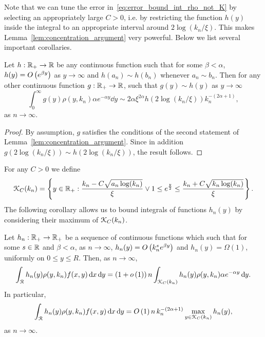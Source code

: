 Note that we can tune the error in~\eqref{eq:error_bound_int_rho_not_K} by selecting an appropriately large $C > 0$, i.e. by restricting the function $h(y)$ inside the integral to an appropriate interval around $2\log(k_n/\xi)$. This makes Lemma~\ref{lem:concentration_argument} very powerful. Below we list several important corollaries. 

\begin{corollary}\label{cor:concentration_of_heights_asymptotics}
Let $h : {\mathbb R}_+ \to {\ensuremath{\mathbb R}}$ be any continuous function such that for some $\beta < \alpha$, $h(y) = O\left(e^{\beta y}\right)$ as $y \to \infty$ and $h(a_n) \sim h(b_n)$ whenever $a_n \sim b_n$. Then for any other continuous function $g: {\mathbb R}_+ \to {\ensuremath{\mathbb R}}$, such that $g(y) \sim h(y)$ as $y \to \infty$
\begin{equation}\label{eq:concentration_h_sim_rho}
	\int_0^\infty g(y) \rho(y,k_n) \alpha e^{-\alpha y} \dd y \sim  
		2\alpha \xi^{2\alpha} h(2\log(k_n/\xi)) k_n^{-(2\alpha + 1)},
\end{equation}
as $n \to \infty$.
\end{corollary}

\begin{proof}
By assumption, $g$ satisfies the conditions of the second statement of Lemma~\ref{lem:concentration_argument}. Since in addition $g(2\log(k_n/\xi)) \sim h(2\log(k_n/\xi))$, the result follows.
\end{proof}


For any $C > 0$ we define
\begin{equation}\label{eq:def_K_C_set}
	{\mathcal K}_C(k_n) = \left\{y \in {\ensuremath{\mathbb R}}_+ : \frac{k_n - C \sqrt{a_n \log(k_n)}}{\xi} \vee 1 \le e^{\frac{y}{2}}
	\le \frac{k_n + C \sqrt{k_n \log(k_n)}}{\xi} \right\}.
\end{equation}
The following corollary allows us to bound integrals of functions $h_n(y)$ by considering their maximum of ${\mathcal K}_{C}(k_n)$.

\begin{corollary}\label{cor:concentration_heights_bounds_n}
Let $h_n : {\mathbb R}_+ \to {\ensuremath{\mathbb R}}_+$ be a sequence of continuous functions which such that for some $s \in {\ensuremath{\mathbb R}}$ and $\beta < \alpha$, as $n \to \infty$, $h_n(y) = O\left(k_n^{s} e^{\beta y}\right)$ and $h_n(y) = \Omega(1)$, uniformly on $0 \le y \le R$. Then, as $n \to \infty$,
\[
	\int_{{\mathcal R}} h_n(y) \rho(y,k_n) f(x,y) \operatorname{\mathrm{d}\hspace{-2pt}} x \operatorname{\mathrm{d}\hspace{-2pt}} y 
	= (1 + o\left(1\right)) \, n \int_{{\mathcal K}_{C}(k_n)} h_n(y) \rho(y,k_n) \alpha e^{-\alpha y} \operatorname{\mathrm{d}\hspace{-2pt}} y.
\]
In particular,
\[
	\int_{{\mathcal R}} h_n(y) \rho(y,k_n) f(x,y) \operatorname{\mathrm{d}\hspace{-2pt}} x \operatorname{\mathrm{d}\hspace{-2pt}} y = O\left(1\right) n \, k_n^{-(2\alpha + 1)} \max_{y \in {\mathcal K}_{C}(k_n)} h_n(y),
\]
as $n \to \infty$.
\end{corollary}

